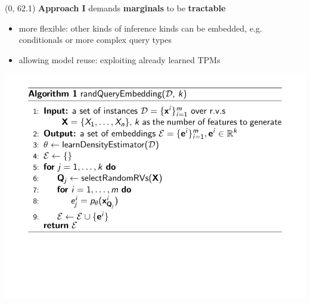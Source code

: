 \documentclass[final]{beamer}
\begin{document}
\begin{frame}{}
  \begin{textblock}{25.2}(0, 62.1)
    \small
    \textbf{Approach I} demands \textbf{marginals} to be \textbf{tractable}
    \begin{itemize}
    \item more flexible: other kinds of inference kinds can be embedded,
      e.g. conditionals or more complex query
      types~\parencite{Bekker2015}
      \item allowing model reuse: exploiting already learned TPMs
    \end{itemize}
    \vspace{4pt}
    \begin{center}
      \includegraphics[width=0.9\linewidth]{algo_I}
    \end{center}

      


\end{textblock}
\end{frame}
\end{document}
